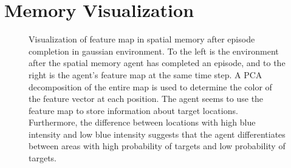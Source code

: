 \chapter{Memory Visualization}
\label{app:memory}

\begin{figure}
    \centering
    
    \caption[Spatial memory visualization]{Visualization of feature map in spatial memory after episode completion in gaussian environment. To the left is the environment after the spatial memory agent has completed an episode, and to the right is the agent's feature map at the same time step. A PCA decomposition of the entire map is used to determine the color of the feature vector at each position. The agent seems to use the feature map to store information about target locations. Furthermore, the difference between locations with high blue intensity and low blue intensity suggests that the agent differentiates between areas with high probability of targets and low probability of targets.}
    \label{fig:memory}
\end{figure}    
